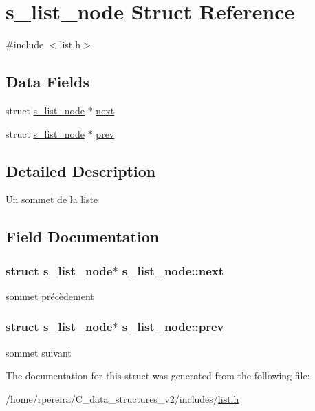\hypertarget{structs__list__node}{}\section{s\+\_\+list\+\_\+node Struct Reference}
\label{structs__list__node}


{\ttfamily \#include $<$list.\+h$>$}

\subsection*{Data Fields}
\begin{DoxyCompactItemize}
\item 
struct \hyperlink{structs__list__node}{s\+\_\+list\+\_\+node} $\ast$ \hyperlink{structs__list__node_ac7276a9f1c0e95652a447c40556a474b}{next}
\item 
struct \hyperlink{structs__list__node}{s\+\_\+list\+\_\+node} $\ast$ \hyperlink{structs__list__node_a5aab2b470c7b670ca8e6df4c87aef533}{prev}
\end{DoxyCompactItemize}


\subsection{Detailed Description}
Un sommet de la liste 

\subsection{Field Documentation}
\subsubsection[{\texorpdfstring{next}{next}}]{\setlength{\rightskip}{0pt plus 5cm}struct {\bf s\+\_\+list\+\_\+node}$\ast$ s\+\_\+list\+\_\+node\+::next}\hypertarget{structs__list__node_ac7276a9f1c0e95652a447c40556a474b}{}\label{structs__list__node_ac7276a9f1c0e95652a447c40556a474b}
sommet précèdement 
\subsubsection[{\texorpdfstring{prev}{prev}}]{\setlength{\rightskip}{0pt plus 5cm}struct {\bf s\+\_\+list\+\_\+node}$\ast$ s\+\_\+list\+\_\+node\+::prev}\hypertarget{structs__list__node_a5aab2b470c7b670ca8e6df4c87aef533}{}\label{structs__list__node_a5aab2b470c7b670ca8e6df4c87aef533}
sommet suivant 

The documentation for this struct was generated from the following file\+:\begin{DoxyCompactItemize}
\item 
/home/rpereira/\+C\+\_\+data\+\_\+structures\+\_\+v2/includes/\hyperlink{list_8h}{list.\+h}\end{DoxyCompactItemize}
